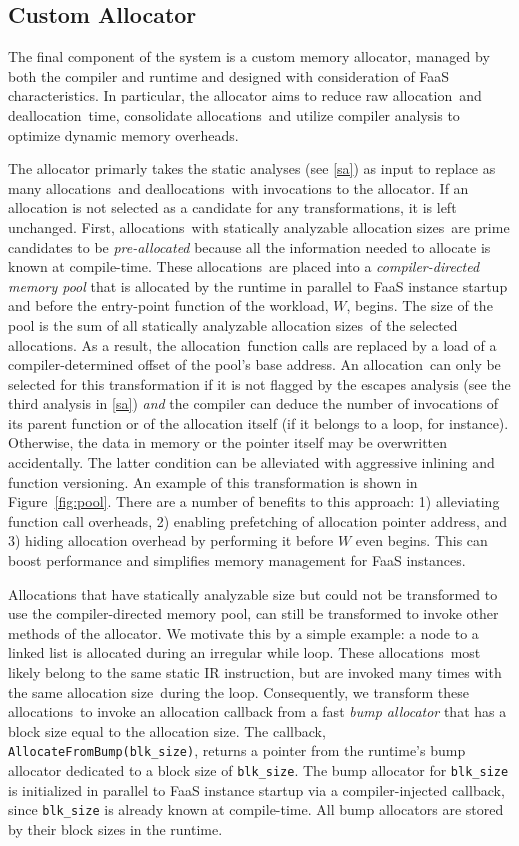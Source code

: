 \documentclass{article}
\def\ALL{allocation}
\def\DALL{deallocation}
\def\ALLS{allocations}
\def\DALLS{deallocations}
\def\SIZE{allocation size}
\def\SIZES{allocation sizes}
\begin{document}
\subsection{Custom Allocator} \label{ca}
The final component of the system is a custom memory allocator, managed by both
the compiler and runtime and designed with consideration of FaaS characteristics.
In particular, the allocator aims to reduce raw \ALL\ and \DALL\ time, consolidate 
\ALLS\, and utilize compiler analysis to optimize dynamic memory overheads. 

The allocator primarly takes the static analyses (see \ref{sa})
as input to replace as many \ALLS\ and \DALLS\ with invocations to the allocator. If
an allocation is not selected as a candidate for any transformations, it is left unchanged.
First, \ALLS\ with statically analyzable \SIZES\ are prime candidates to be 
\textit{pre-allocated} because all the information needed to allocate is known at
compile-time. These \ALLS\ are placed into a \textit{compiler-directed memory pool} that is
allocated by the runtime in parallel to FaaS instance startup and before the entry-point function 
of the workload, $W$, begins. The size of the pool is the sum of all statically 
analyzable \SIZES\ of the selected \ALLS . As a result, the \ALL\ function calls are 
replaced by a load of a compiler-determined offset of the pool's base address.
An \ALL\ can only be selected for this transformation if it is not flagged by 
the escapes analysis (see the third analysis in \ref{sa}) \textit{and} the compiler 
can deduce the number of invocations of its parent function or of the allocation
itself (if it belongs to a loop, for instance). Otherwise, the data
in memory or the pointer itself may be overwritten accidentally. The latter condition
can be alleviated with aggressive inlining and function versioning. An example of 
this transformation is shown in Figure~\ref{fig:pool}. There are a number of 
benefits to this approach: 1) alleviating function call overheads, 2) enabling 
prefetching of allocation pointer address, and 3) hiding allocation overhead by performing 
it before $W$ even begins. This can boost performance and simplifies memory management
for FaaS instances. 

Allocations that have statically analyzable size but could not be transformed to
use the compiler-directed memory pool, can still be transformed to invoke other
methods of the allocator. We motivate this by a simple example: a node 
to a linked list is allocated during an irregular while loop. These \ALLS\ most
likely belong to the same static IR instruction, but are invoked many times with
the same \SIZE\ during the loop. Consequently, we transform these \ALLS\ to 
invoke an allocation callback from a fast \textit{bump allocator} that has a block size equal to the 
\SIZE . The callback, \texttt{AllocateFromBump(blk\_size)}, returns a pointer from the
runtime's bump allocator dedicated to a block size of \texttt{blk\_size}. The bump allocator
for \texttt{blk\_size} is initialized in parallel to FaaS instance startup via 
a compiler-injected callback, since \texttt{blk\_size} is already known at compile-time.
All bump allocators are stored by their block sizes in the runtime.
\end{document}
